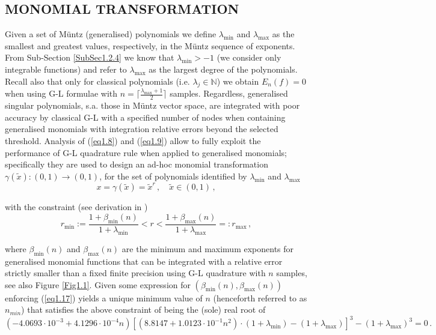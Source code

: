 \documentclass[a4paper, twosided]{book}
\begin{document}
\subsection[Monomial transformation]{\changefont MONOMIAL TRANSFORMATION}\label{SubSec1.2.6}

Given a set of Müntz (generalised) polynomials we define $\lambda_{\text{min}}$ and $\lambda_{\text{max}}$ as the smallest and greatest values, respectively, in the Müntz sequence of exponents. From Sub-Section \ref{SubSec1.2.4} we know that $\lambda_{\text{min}}>-1$ (we consider only integrable functions) and refer to $\lambda_{\text{max}}$ as the largest degree of the polynomials. Recall also that only for classical polynomials (i.e. $\lambda_j\in\mathbb{N}$) we obtain $E_n(f)=0$ when using G-L formulae with $n = \lceil \frac{\lambda_{\text{max}}+1}{2} \rceil$ samples. Regardless, generalised singular polynomials, s.a. those in Müntz vector space, are integrated with poor accuracy by classical G-L with a specified number of nodes when containing generalised monomials with integration relative errors beyond the selected threshold. Analysis of (\ref{eq1.8}) and (\ref{eq1.9}) allow to fully exploit the performance of G-L quadrature rule when applied to generalised monomials; specifically they are used to design an ad-hoc monomial transformation $\gamma(\tilde{x}):(0,1)\to(0,1)$, for the set of polynomials identified by $\lambda_{\text{min}}$ and $\lambda_{\text{max}}$
\begin{equation}\label{eq1.16}
    x = \gamma(\tilde{x}) = \tilde{x}^r\,,\quad\tilde{x}\in(0,1)\,,
\end{equation}

\noindent
with the constraint (see derivation in \cite{Lombardi09, Lombardi21})
\begin{equation}\label{eq1.17}
    r_{\text{min}}:=\frac{1+\beta_{\text{min}}(n)}{1+\lambda_{\text{min}}} < r < \frac{1+\beta_{\text{max}}(n)}{1+\lambda_{\text{max}}}=:r_{\text{max}}\,,
\end{equation}

\noindent
where $\beta_{\text{min}}(n)$ and $\beta_{\text{max}}(n)$ are the minimum and maximum exponents for generalised monomial functions that can be integrated with a relative error strictly smaller than a fixed finite precision using G-L quadrature with $n$ samples, see also Figure \ref{Fig1.1}. Given some expression for $(\beta_{\text{min}}(n),\beta_{\text{max}}(n))$ enforcing (\ref{eq1.17}) yields a unique minimum value of $n$ (henceforth referred to as $n_{min}$) that satisfies the above constraint of being the (sole) real root of
\begin{equation}\label{eq1.18}
    (-4.0693\cdot10^{-3}+4.1296\cdot10^{-4}n)[(8.8147+1.0123\cdot10^{-1}n^2)\cdot(1+\lambda_{\text{min}})-(1+\lambda_{\text{max}})]^3 - (1+\lambda_{\text{max}})^3=0\,.
\end{equation}
\end{document}
